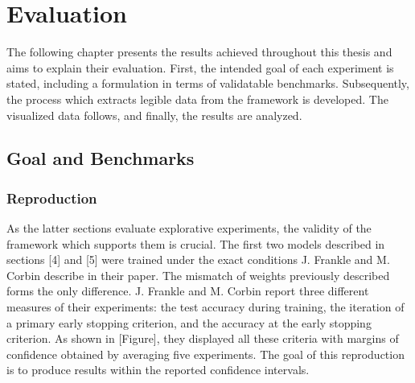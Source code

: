 \chapter{Evaluation}
\label{ch:evaluation}
The following chapter presents the results achieved throughout this thesis and aims to explain their evaluation. First, the intended goal of each experiment is stated, including a  formulation in terms of validatable benchmarks. Subsequently, the process which extracts legible data from the framework is developed. The visualized data follows, and finally, the results are analyzed.

\section{Goal and Benchmarks}
\subsection*{Reproduction}
As the latter sections evaluate explorative experiments, the validity of the framework which supports them is crucial. The first two models described in sections [4] and [5] were trained under the exact conditions J. Frankle and M. Corbin describe in their paper. The mismatch of weights previously described forms the only difference.
J. Frankle and M. Corbin report three different measures of their experiments: the test accuracy during training, the iteration of a primary early stopping criterion, and the accuracy at the early stopping criterion. As shown in [Figure], they displayed all these criteria with margins of confidence obtained by averaging five experiments. The goal of this reproduction is to produce results within the reported confidence intervals.  
